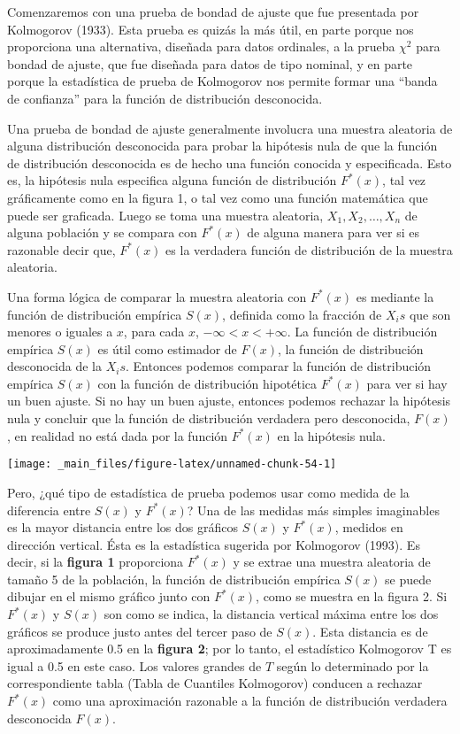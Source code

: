 \documentclass[
  a4paper,
  oneside,
  openany]{book}
\begin{document}
Comenzaremos con una prueba de bondad de ajuste que fue presentada por Kolmogorov (1933). Esta prueba es quizás la más útil, en parte porque nos proporciona una alternativa, diseñada para datos ordinales, a la prueba \(\chi^2\) para bondad de ajuste, que fue diseñada para datos de tipo nominal, y en parte porque la estadística de prueba de Kolmogorov nos permite formar una ``banda de confianza'' para la función de distribución desconocida.

Una prueba de bondad de ajuste generalmente involucra una muestra aleatoria de alguna distribución desconocida para probar la hipótesis nula de que la función de distribución desconocida es de hecho una función conocida y especificada. Esto es, la hipótesis nula especifica alguna función de distribución \(F ^*(x)\), tal vez gráficamente como en la figura 1, o tal vez como una función matemática que puede ser graficada. Luego se toma una muestra aleatoria, \(X_{1},X_{2},\ldots, X_{n}\) de alguna población y se compara con \(F^*(x)\) de alguna manera para ver si es razonable decir que, \(F^*(x)\) es la verdadera función de distribución de la muestra aleatoria.

Una forma lógica de comparar la muestra aleatoria con \(F^*(x)\) es mediante la función de distribución empírica \(S(x)\), definida como la fracción de \(X_{i}s\) que son menores o iguales a \(x\), para cada \(x\), \(-\infty<x< + \infty\).
La función de distribución empírica \(S(x)\) es útil como estimador de \(F(x)\), la función de distribución desconocida de la \(X_{i}s\). Entonces podemos comparar la función de distribución empírica \(S(x)\) con la función de distribución hipotética \(F^*(x)\) para ver si hay un buen ajuste.
Si no hay un buen ajuste, entonces podemos rechazar la hipótesis nula y concluir que la función de distribución verdadera pero desconocida, \(F(x)\), en realidad no está dada por la función \(F^*(x)\) en la hipótesis nula.

\begin{center}\texttt{[image: \_main\_files/figure-latex/unnamed-chunk-54-1]} \end{center}

Pero, ¿qué tipo de estadística de prueba podemos usar como medida de la diferencia entre \(S(x)\) y \(F^* (x)\)? Una de las medidas más simples imaginables es la mayor distancia entre los dos gráficos \(S(x)\) y \(F^*(x)\), medidos en dirección vertical. Ésta es la estadística sugerida por Kolmogorov (1993).
Es decir, si la \textbf{figura 1} proporciona \(F^*(x)\) y se extrae una muestra aleatoria de tamaño 5 de la población, la función de distribución empírica \(S(x)\) se puede dibujar en el mismo gráfico junto con \(F^ *(x)\), como se muestra en la figura 2.
Si \(F^*(x)\) y \(S(x)\) son como se indica, la distancia vertical máxima entre los dos gráficos se produce justo antes del tercer paso de \(S(x)\).
Esta distancia es de aproximadamente 0.5 en la \textbf{figura 2}; por lo tanto, el estadístico Kolmogorov T es igual a 0.5 en este caso.
Los valores grandes de \(T\) según lo determinado por la correspondiente tabla (Tabla de Cuantiles Kolmogorov) conducen a rechazar \(F^*(x)\) como una aproximación razonable a la función de distribución verdadera desconocida \(F(x)\).
\end{document}
